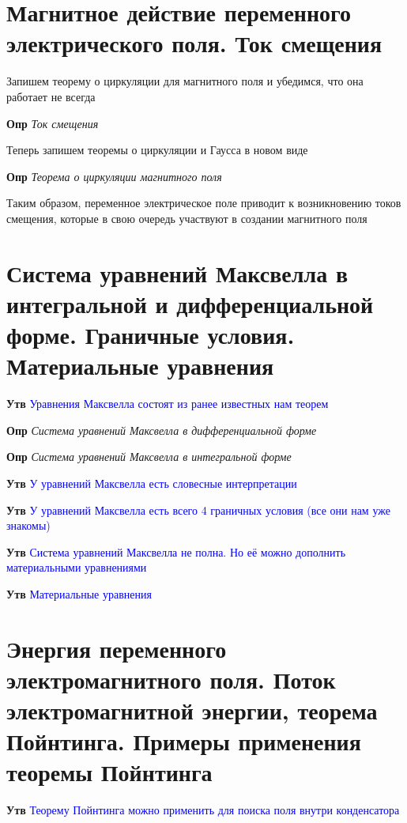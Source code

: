 \documentclass[a4paper, 14pt]{article}
\begin{document}
    \section{Магнитное действие переменного электрического поля.
    Ток смещения}
    
    Запишем теорему о циркуляции для магнитного поля и убедимся, что она работает не всегда
    
    \textbf{Опр} \textit{Ток смещения}
    
    Теперь запишем теоремы о циркуляции и Гаусса в новом виде
    
    \textbf{Опр} \textit{Теорема о циркуляции магнитного поля}
    
    Таким образом, переменное электрическое поле приводит к возникновению токов смещения, которые в свою очередь
    участвуют в создании магнитного поля
    
    \section{Система уравнений Максвелла в интегральной и дифференциальной форме.
    Граничные условия.
    Материальные уравнения}
    
    \textbf{Утв} \textcolor{blue}{Уравнения Максвелла состоят из ранее известных нам теорем}
    
    \textbf{Опр} \textit{Система уравнений Максвелла в дифференциальной форме}
    
    \textbf{Опр} \textit{Система уравнений Максвелла в интегральной форме}
    
    \textbf{Утв} \textcolor{blue}{У уравнений Максвелла есть словесные интерпретации}
    
    \textbf{Утв} \textcolor{blue}{У уравнений Максвелла есть всего 4 граничных условия (все они нам уже знакомы)}
    
    \textbf{Утв} \textcolor{blue}{Система уравнений Максвелла не полна.
    Но её можно дополнить материальными уравнениями}
    
    \textbf{Утв} \textcolor{blue}{Материальные уравнения}
    
    \section{Энергия переменного электромагнитного поля.
    Поток электромагнитной энергии, теорема Пойнтинга.
    Примеры применения теоремы Пойнтинга}
    
    \textbf{Утв} \textcolor{blue}{Теорему Пойнтинга можно применить для поиска поля внутри конденсатора}
    
\end{document}
